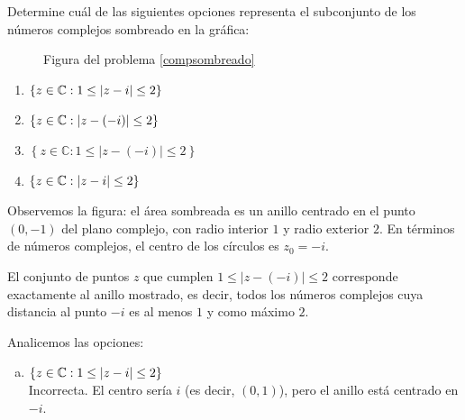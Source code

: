 \begin{prob}\label{compsombreado}
Determine cuál de las siguientes opciones representa el subconjunto de los números complejos sombreado en la gráfica:


\begin{figure}[H]
\centering 		
{}
\caption{Figura del problema \ref{compsombreado}}
\end{figure} 
\begin{multicols}{2}
\begin{enumerate}[$(a)$]
\item  $\left\lbrace z\in \mathbb{C}: 1\leq\left\vert z-i\right\vert\leq 2 \right\rbrace$
\item  $\left\lbrace z\in \mathbb{C}:  \left\vert z-(-i)\right\vert\leq 2 \right\rbrace$
\item $\left\lbrace z\in\mathbb{C}:1\leq|z-(-i)|\leq 2\right\rbrace$
\item  $\left\lbrace z\in \mathbb{C}:  \left\vert z-i\right\vert\leq 2 \right\rbrace$
\end{enumerate}
\end{multicols}

\begin{myproof}
Observemos la figura: el área sombreada es un anillo centrado en el punto $(0,-1)$ del plano complejo, con radio interior $1$ y radio exterior $2$. En términos de números complejos, el centro de los círculos es $z_0 = -i$.

El conjunto de puntos $z$ que cumplen $1 \leq |z-(-i)| \leq 2$ corresponde exactamente al anillo mostrado, es decir, todos los números complejos cuya distancia al punto $-i$ es al menos $1$ y como máximo $2$.

Analicemos las opciones:

\begin{enumerate}[(a)]
\item $\left\lbrace z\in \mathbb{C}: 1\leq\left\vert z-i\right\vert\leq 2 \right\rbrace$\\
Incorrecta. El centro sería $i$ (es decir, $(0,1)$), pero el anillo está centrado en $-i$.


\end{enumerate}
\end{myproof}
\end{prob}
